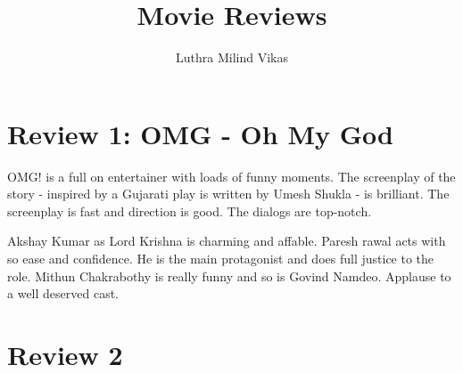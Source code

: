 \documentclass{article}
\author{Luthra Milind Vikas} %
\date{}
\title{Movie Reviews}
\begin{document}
\maketitle

\section{Review 1: OMG - Oh My God}

OMG! is a full on entertainer with loads of funny moments. The screenplay of the story - inspired by a Gujarati play is written by Umesh Shukla - is brilliant. The screenplay is fast and direction is good. The dialogs are top-notch.

Akshay Kumar as Lord Krishna is charming and affable. Paresh rawal acts with so ease and confidence. He is the main protagonist and does full justice to the role. Mithun Chakrabothy is really funny and so is Govind Namdeo. Applause to a well deserved cast.


\section{Review 2}
\end{document}
